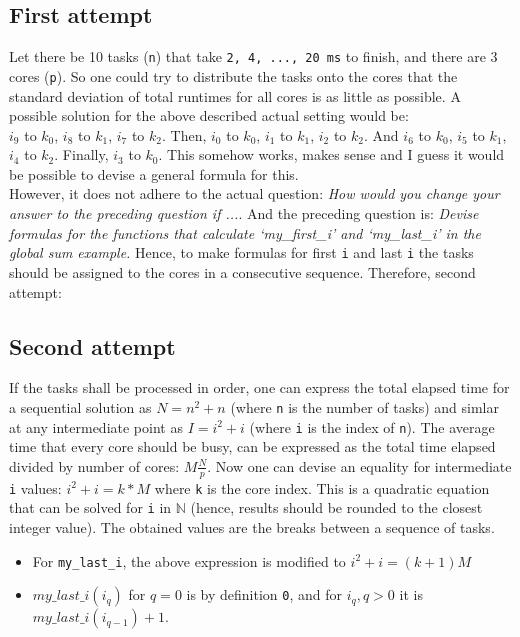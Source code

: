 \documentclass[a4paper,11pt,twoside]{article}
\begin{document}
\subsection{First attempt}
Let there be 10 tasks (\verb+n+) that take \verb+2, 4, ..., 20 ms+ to finish, and there are 3 cores (\verb+p+). So one could try to distribute the tasks onto the cores that the standard deviation of total runtimes for all cores is as little as possible. A possible solution for the above described actual setting would be:\\ $i_{9}$ to $k_{0}$, $i_{8}$ to $k_{1}$, $i_{7}$ to $k_{2}$. Then,  $i_{0}$ to $k_{0}$, $i_{1}$ to $k_{1}$, $i_{2}$ to $k_{2}$. And $i_{6}$ to $k_{0}$, $i_{5}$ to $k_{1}$, $i_{4}$ to $k_{2}$. Finally, $i_{3}$ to $k_{0}$. This somehow works, makes sense and I guess it would be possible to devise a general formula for this.\\
However, it does not adhere to the actual question: \textit{How would you change your answer to the preceding question if ...}. And the preceding question is: \textit{Devise formulas for the functions that calculate `my\_first\_i' and `my\_last\_i' in the global sum example.} Hence, to make formulas for first \verb+i+ and last \verb+i+ the tasks should be assigned to the cores in a consecutive sequence. Therefore, second attempt:

\subsection{Second attempt}
If the tasks shall be processed in order, one can express the total elapsed time for a sequential solution as $N = n^{2} + n$ (where \verb+n+ is the number of tasks) and simlar at any intermediate point as $I = i^{2} + i$ (where \verb+i+ is the index of \verb+n+). The average time that every core should be busy, can be expressed as the total time elapsed divided by number of cores: $M\frac{N}{p}$. Now one can devise an equality for intermediate \verb+i+ values: $i^{2}+i = k*M$ where \verb+k+ is the core index. This is a quadratic equation that can be solved for \verb+i+ in $\mathbb{N}$ (hence, results should be rounded to the closest integer value). The obtained values are the breaks between a sequence of tasks. 
\begin{itemize}
\item For \verb+my_last_i+, the above expression is modified to  $i^{2}+i=(k + 1)M$
\item $my\_last\_i(i_{q})$ for $q=0$ is by definition \verb+0+, and for $i_{q}, q > 0$ it is $my\_last\_i(i_{q-1}) + 1$. 
\end{itemize}
 
\end{document}

